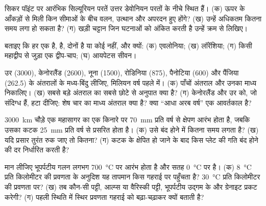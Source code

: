 \begin{exercise}[$\star$]\label{exo:b2:wilson-cycle:3}
सिकर पॉइंट पर आरंभिक सिल्यूरियन परतें उत्तर डेवोनियन परतों के नीचे स्थित हैं। (क) ऊपर के आँकड़ों से मिली
किन सीमाओं के बीच वलन, उत्थान और अपरदन हुए होंगे? (ख) उन्हें
अधिकतम कितना समय लगा हो सकता है? (ग) खड़ी चट्टान जिन घटनाओं को अंकित करती है उन्हें क्रम से लिखिए।
\end{exercise}

\begin{exercise}[$\star$]\label{exo:b2:wilson-cycle:4}
बताइए कि हर एक  है,  है, दोनों है या कोई नहीं, और क्यों: (क) एवलोनिया;
(ख) लॉरेंशिया; (ग) किसी महाद्वीप से जुड़ा एक द्वीप-चाप; (घ) आयपेटस सीवन।
\end{exercise}

\begin{exercise}[$\star\star$]\label{exo:b2:wilson-cycle:5}
 उर (3000), केनोरलैंड (2600), नूना (1500), रोडिनिया (875), पैनोटिया (600) और
पैंजिया (262.5) के अंतरालों के मध्य-बिंदु लीजिए, मिलियन वर्ष पहले में।
(क) पाँचों अंतराल और उनका माध्य निकालिए। (ख) सबसे बड़े अंतराल का सबसे छोटे से अनुपात
क्या है? (ग) केनोरलैंड और उर को, जो संदिग्ध हैं, हटा दीजिए: शेष चार का माध्य अंतराल
क्या है? क्या ``आधा अरब वर्ष'' एक आवर्तकाल है?
\end{exercise}

\begin{exercise}[$\star\star$]\label{exo:b2:wilson-cycle:6}
\qty{3000}{km} चौड़े एक महासागर का एक किनारे पर \qty{70}{mm} प्रति वर्ष से क्षेपण आरंभ होता है,
जबकि उसका कटक \qty{25}{mm} प्रति वर्ष से प्रसरित होता है। (क) उसे बंद होने में कितना समय लगता है?
(ख) यदि प्रसार तुरंत रुक जाए तो कितना? (ग) कटक के क्षेपित हो जाने के बाद किस प्लेट की गति
बंद होने की दर निर्धारित करती है?
\end{exercise}

\begin{exercise}[$\star\star$]\label{exo:b2:wilson-cycle:7}
मान लीजिए भूपर्पटीय गलन लगभग \qty{700}{\celsius} पर आरंभ होता है और सतह
\qty{0}{\celsius} पर है। (क) \qty{8}{\celsius} प्रति किलोमीटर की प्रवणता के अनुदिश यह तापमान किस गहराई पर
पहुँचता है? \qty{30}{\celsius} प्रति किलोमीटर की प्रवणता पर? (ख) तब कौन-सी पट्टी, आल्प्स या
वैरिस्की पट्टी, भूपर्पटीय उद्गम के  और ग्रेनाइट प्रकट करेगी?
(ग) पहली स्थिति में स्थिर प्रवणता गहराई को बढ़ा-चढ़ाकर क्यों बताती है?
\end{exercise}

